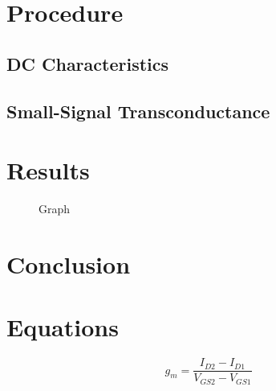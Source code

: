 
\section{Procedure}
\label{sec:procedure}

\subsection{DC Characteristics}
\label{sec:inverter}

\subsection{Small-Signal Transconductance}
\label{sec:nand}

\section{Results}
\label{sec:results}

\begin{figure}[hbtp]
  \centering
  \resizebox{1.0\textwidth}{!}{}
  \caption{\label{fig:graph} Graph}
\end{figure}

\section{Conclusion}
\label{sec:conclusion}

 \section{Equations}
 \label{sec:equations}

%
 \begin{equation}
   \label{eq:transconduct}
   g_m = \frac{I_{D2}-I_{D1}}{V_{GS2}-V_{GS1}}
 \end{equation}


